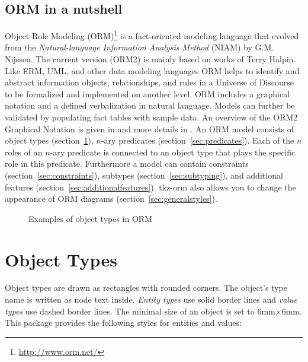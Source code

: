 \documentclass[a4paper,10pt]{article}
\begin{document}
\subsection*{ORM in a nutshell}
Object-Role Modeling (ORM)\footnote{\url{http://www.orm.net/}} is a fact-oriented modeling language that evolved from the \textit{Natural-language Information Analysis Method} (NIAM) by G.M. Nijssen. The current version (ORM2) is mainly based on works of Terry Halpin. Like ERM, UML, and other data modeling languages ORM helps to identify and abstract information objects, relationships, and rules in a Universe of Discourse to be formalized and implemented on another level. ORM includes a graphical notation and a defined verbalization in natural language. Models can further be validated by populating fact tables with sample data. An overview of the ORM2 Graphical Notation is given in \cite{Halpin2005} and more details in \cite{Halpin2008}. An ORM model consists of object types (section~\ref{sec:objecttypes}), $n$-ary predicates  (section~\ref{sec:predicates}). Each of the $n$ roles of an $n$-ary predicate is connected to an object type that plays the specific role in this predicate. Furthermore a model can contain constraints (section~\ref{sec:constraints}), subtypes (section~\ref{sec:subtyping}), and additional features (section~\ref{sec:additionalfeatures}). \textsf{tkz-orm} also allows you to change the appearance of ORM diagrams (section~\ref{sec:generalstyles}).

\begin{figure}[ht]
  \caption{Examples of object types in ORM}
\end{figure}

\pagebreak
\section{Object Types}
\label{sec:objecttypes}
Object types are drawn as rectangles with rounded corners. The object's type name is written as node text inside. \emph{Entity types} use solid border lines and \emph{value types} use dashed border lines. The minimal size of an object is set to 6mm$\times$6mm. This package provides the following styles for entities and values:
\end{document}
